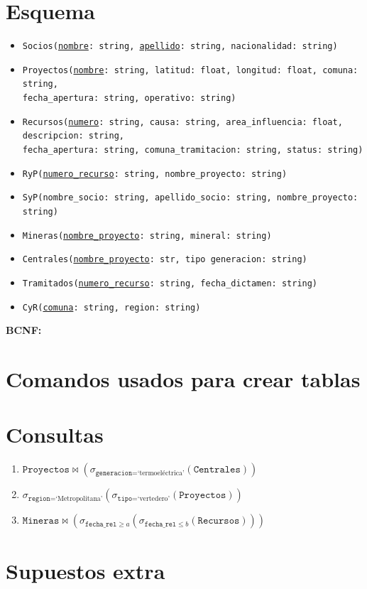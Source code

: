 \documentclass{article}
\begin{document}
\section{Esquema}

	\begin{itemize}
		\item \texttt{Socios(\underline{nombre}: string, \underline{apellido}: string, nacionalidad: string)} 
		\item \texttt{Proyectos(\underline{nombre}: string, latitud: float, longitud: float, comuna: string,\\ fecha\_apertura: string, operativo: string)} 
		\item \texttt{Recursos(\underline{numero}: string, causa: string, area\_influencia: float, descripcion: string,\\ fecha\_apertura: string, comuna\_tramitacion: string, status: string)}
		\item \texttt{RyP(\underline{numero\_recurso}: string, nombre\_proyecto: string)} 
		
		\item \texttt{SyP(nombre\_socio: string, apellido\_socio: string, nombre\_proyecto: string)} 
		 
		\item \texttt{Mineras(\underline{nombre\_proyecto}: string, mineral: string)} 
		\item \texttt{Centrales(\underline{nombre\_proyecto}: str, tipo generacion: string)} 
		\item \texttt{Tramitados(\underline{numero\_recurso}: string, fecha\_dictamen: string)} 
		
		\item \texttt{CyR(\underline{comuna}: string, region: string)} 
	\end{itemize}

\textbf{BCNF:} %

\section{Comandos usados para crear tablas}

\section{Consultas}

\begin{enumerate}
	\item $\texttt{Proyectos} \bowtie (\sigma_{\texttt{generacion} = \text{`termoeléctrica'}}(\texttt{Centrales}))$ 
	\item $\sigma_{\texttt{region} = \text{`Metropolitana'}}(\sigma_{\texttt{tipo} = \text{`vertedero'}}(\texttt{Proyectos}))$ 
	\item $\texttt{Mineras} \bowtie (\sigma_{\texttt{fecha\_rel} \geq a}(\sigma_{\texttt{fecha\_rel} \leq b}(\texttt{Recursos})))$  
\end{enumerate}

\section{Supuestos extra}
\end{document}
